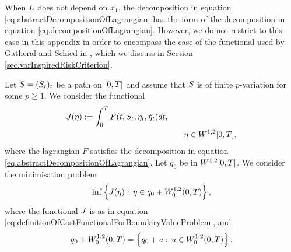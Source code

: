 \documentclass[10pt,a4paper]{article}
\begin{document}
\begin{appendices}
\begin{remark}
When $L$ does not depend on $x_1$, the  decomposition in equation \eqref{eq.abstractDecompositionOfLagrangian} has the form of  the decomposition in equation \eqref{eq.decompositionOfLagrangian}. However, we do not restrict to this case in this appendix in order to encompass the case of the functional used by Gatheral and Schied in \cite{GS11opt}, which we discuss in Section \ref{sec.varInspiredRiskCriterion}. 
\end{remark}

 
Let $S = (S_t)_t$ be a path on ${[0,T]}$ and assume that $S$ is of finite $p$-variation for some $p\geq 1$. We consider the functional 
\begin{equation}\label{eq.definitionOfCostFunctionalForBoundaryValueProblem}
\begin{split}
J (\eta) := \int_{0}^{T} F(t,S_t,\eta_t,\dot{\eta}_t) dt , & \\ 
& \qquad \eta \in W^{1,2}{[0,T]},
\end{split}
\end{equation}
where the lagrangian $F$ satisfies the decomposition in equation \eqref{eq.abstractDecompositionOfLagrangian}. 
Let $q_0$ be in $W^{1,2}{[0,T]}$. We consider the minimisation problem
\begin{equation}
\label{eq.minimisationBoundaryValueProblem}
\inf\left\lbrace
J (\eta): \, \eta \in q_0 +W^{1,2}_{0}(0,T)
\right\rbrace,
\end{equation}
where the functional $J$ is as in equation \eqref{eq.definitionOfCostFunctionalForBoundaryValueProblem},  and
\begin{equation*}
 q_0 +W^{1,2}_{0}(0,T) = \left\lbrace
 q_0 + u: \, u \in W^{1,2}_{0}(0,T)
 \right\rbrace.
\end{equation*}


\end{appendices}
\end{document}
